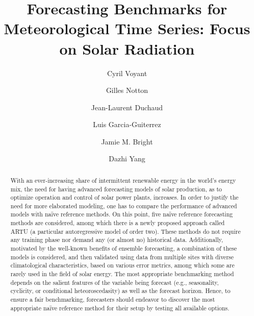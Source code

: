 \documentclass[preprint,12pt,3p]{elsarticle}
\begin{document}
\begin{frontmatter}

\title{Forecasting Benchmarks for Meteorological Time Series: Focus on Solar Radiation}

\author[label1]{Cyril Voyant} 
\author[label1]{Gilles Notton}%
\author[label1]{Jean-Laurent Duchaud}
\author[label1]{Luis Garcia-Guiterrez} 
\author[label2]{Jamie M. Bright}
\author[label3]{Dazhi Yang} 
\address[label1]{University of Corsica, SPE Laboratory, France}
\address[label2]{UK Power Networks, London, UK}
\address[label3]{Harbin Institute of Technology, School of Electrical Engineering and Automation, Harbin, Heilongjiang, China}

\begin{abstract}
With an ever-increasing share of intermittent renewable energy in the world's energy mix, the need for having advanced forecasting models of solar production, as to optimize operation and control of solar power plants, increases. In order to justify the need for more elaborated modeling, one has to compare the performance of advanced models with na\"ive reference methods. On this point, five na\"ive reference forecasting methods are considered, among which there is a newly proposed approach called ARTU (a particular autoregressive model of order two). These methods do not require any training phase nor demand any (or almost no) historical data. Additionally, motivated by the well-known benefits of ensemble forecasting, a combination of these models is considered, and then validated using data from multiple sites with diverse climatological characteristics, based on various error metrics, among which some are rarely used in the field of solar energy. The most appropriate benchmarking method depends on the salient features of the variable being forecast (e.g., seasonality, cyclicity, or conditional heteoroscedasity) as well as the forecast horizon. Hence, to ensure a fair benchmarking, forecasters should endeavor to discover the most appropriate na\"ive reference method for their setup by testing all available options.


\end{abstract}



\end{frontmatter}
\end{document}
